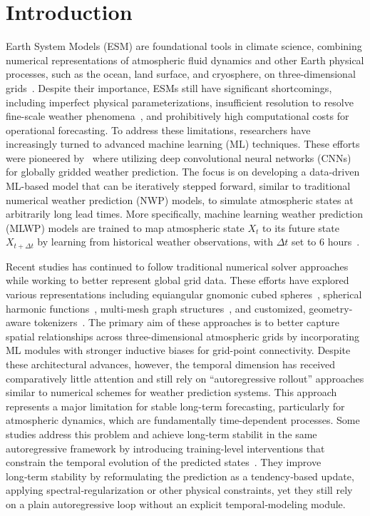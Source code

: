 \documentclass[11pt]{article}
\begin{document}
\newpage
\section{Introduction}
    Earth System Models (ESM) are foundational tools in climate science, combining numerical representations of atmospheric fluid dynamics and other Earth physical processes, such as the ocean, land surface, and cryosphere, on three-dimensional grids~\cite{erfani2024spatiotemporal}. Despite their importance, ESMs still have significant shortcomings, including imperfect physical parameterizations, insufficient resolution to resolve fine-scale weather phenomena~\cite{gentine2018could}, and prohibitively high computational costs for operational forecasting. To address these limitations, researchers have increasingly turned to advanced machine learning (ML) techniques. These efforts were pioneered by~\cite{dueben2018challenges,scher2018toward,weyn2019can} where utilizing deep convolutional neural networks (CNNs) for globally gridded weather prediction. The focus is on developing a data-driven ML-based model that can be iteratively stepped forward, similar to traditional numerical weather prediction (NWP) models, to simulate atmospheric states at arbitrarily long lead times.    
    More specifically, machine learning weather prediction (MLWP) models are trained to map atmospheric state $X_t$ to its future state $X_{t+\Delta t}$ by learning from historical weather observations, with $\Delta t$ set to 6 hours~\cite{scher2018predicting,scher2019weather,weyn2021sub,keisler2022forecasting, pathak2022fourcastnet,pmlr-v202-bonev23a,bi2023accurate,lam2023learning,chen2023fuxi}.

    Recent studies has continued to follow traditional numerical solver approaches while working to better represent global grid data. These efforts have explored various representations including equiangular gnomonic cubed spheres~\cite{weyn2020improving}, spherical harmonic functions~\cite{pmlr-v202-bonev23a}, multi-mesh graph structures~\cite{lam2023learning}, and customized, geometry-aware tokenizers~\cite{bi2023accurate, nguyen2023climax}. The primary aim of these approaches is to better capture spatial relationships across three-dimensional atmospheric grids by incorporating ML modules with stronger inductive biases for grid-point connectivity. Despite these architectural advances, however, the temporal dimension has received comparatively little attention and still rely on ``autoregressive rollout'' approaches similar to numerical schemes for weather prediction systems. This approach represents a major limitation for stable long-term forecasting, particularly for atmospheric dynamics, which are fundamentally time-dependent processes. Some studies address this problem and achieve long‑term stabilit in the same autoregressive framework by introducing training-level interventions that constrain the temporal evolution of the predicted states~\cite{watt2023ace, guan2025lucie}. They improve long‑term stability by reformulating the prediction as a tendency‑based update, applying spectral‑regularization or other physical constraints, yet they still rely on a plain autoregressive loop without an explicit temporal‑modeling module.     
 
\end{document}
